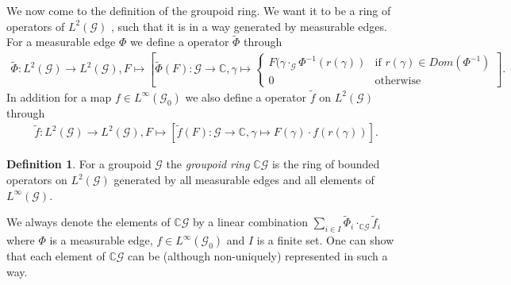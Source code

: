 \documentclass[12pt,a4paper]{scrartcl}
\theoremstyle{plain}
\theoremstyle{definition}
\newtheorem{Definition}[Theorem]{Definition}
\numberwithin{equation}{section}
\newcommand{\C}{\mathbb{C}} %
\newcommand{\2}{\mathbb{Z} / 2 \mathbb{Z}}
\newcommand{\G}{\mathcal{G}}
\newcommand{\1}{\bar{1}}
\newcommand{\0}{\bar{0}}
\begin{document}
We now come to the definition of the groupoid ring. We want it to be a ring of operators of	$L^2(\G)$ , such that it is in a way generated by measurable edges. For a measurable edge $\Phi$ we define a operator $\tilde \Phi$ through
\begin{align*}
	\tilde \Phi: L^2(\G) \to L^2(\G), F \mapsto \left[ \tilde \Phi (F): \G \to \C, \gamma \mapsto \begin{cases}
	F(\gamma \cdot_{\G} \Phi^{-1}(r(\gamma)) & \text{if } r(\gamma) \in Dom(\Phi^{-1}) \\
	0 & \text{otherwise}
	\end{cases} \right] .
\end{align*}
In addition for a map $f \in L^\infty (\G_0)$ we also define a operator $\tilde f$ on $L^2(\G)$ through
\begin{align*}
	\tilde f: L^2(\G) \to L^2(\G), F \mapsto [\tilde f(F): \G \to \C, \gamma \mapsto F(\gamma) \cdot f(r(\gamma))].
\end{align*}
\begin{Definition}\label{groupoid_ring}
	For a groupoid $\G$ the \emph{groupoid ring} $\C\G$ is the ring of bounded operators on $L^2(\G)$ generated by all measurable edges and all elements of $L^\infty(\G)$.
\end{Definition}
We always denote the elements of $\C\G$ by a linear combination $\sum_{i \in I} \tilde \Phi_i \cdot_{\C \G} \tilde f_i$ where $\Phi$ is a measurable edge, $f \in L^\infty(\G_0)$ and $I$ is a finite set. One can show that each element of $\C \G$ can be (although non-uniquely) represented in such a way. 
\end{document}
